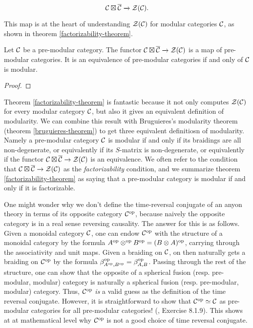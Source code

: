 $${\mathcal C}\boxtimes \overline{{\mathcal C}}\xrightarrow{} {\mathcal Z}({\mathcal C}).$$

This map is at the heart of understanding ${\mathcal Z}({\mathcal C})$ for modular categories ${\mathcal C}$, as shown in theorem \ref{factorizability-theorem}.

\begin{thrm}\label{factorizability-theorem} Let ${\mathcal C}$ be a pre-modular category. The functor ${\mathcal C}\boxtimes \overline{{\mathcal C}}\xrightarrow{}{\mathcal Z}({\mathcal C})$ is a map of pre-modular categories. It is an equivalence of pre-modular categories if and only of ${\mathcal C}$ is modular.
\end{thrm}
\begin{proof}
\end{proof}

\begin{rem} Theorem \ref{factorizability-theorem} is fantastic because it not only computes ${\mathcal Z}({\mathcal C})$ for every modular category ${\mathcal C}$, but also it gives an equivalent definition of modularity. We can combine this result with Bruguieres's modularity theorem (theorem \ref{bruguieres-theorem}) to get three equivalent definitiosn of modularity. Namely a pre-modular category ${\mathcal C}$ is modular if and only if its braidings are all non-degenerate, or equivalently if its $S$-matrix is non-degenerate, or equivalently if the functor ${\mathcal C}\boxtimes \overline{{\mathcal C}}\to {\mathcal Z}({\mathcal C})$ is an equivalence. We often refer to the condition that ${\mathcal C}\boxtimes \overline{{\mathcal C}}\to {\mathcal Z}({\mathcal C})$ as the {\em factorizability} condition, and we summarize theorem \ref{factorizability-theorem} as saying that a pre-modular category is modular if and only if it is factorizable.
\end{rem}

\begin{rem}
One might wonder why we don't define the time-reversal conjugate of an anyon theory in terms of its opposite category ${\mathcal C}^{\operatorname{op}}$, because naively the opposite category is in a real sense reversing causality. The answer for this is as follows. Given a monoidal category ${\mathcal C}$, one can endow ${\mathcal C}^{\operatorname{op}}$ with the structure of a monoidal category by the formula $A^{\operatorname{op}}\otimes^{\operatorname{op}}B^{\operatorname{op}}=(B\otimes A)^{\operatorname{op}}$, carrying through the associativity and unit maps. Given a braiding on ${\mathcal C}$, on then naturally gets a braiding on ${\mathcal C}^{\operatorname{op}}$ by the formula $\beta_{A^{\operatorname{op}},B^{\operatorname{op}}}^{\operatorname{op}}=\beta_{A,B}^{\operatorname{op}}$. Passing through the rest of the structure, one can show that the opposite of a spherical fusion (resp. pre-modular, modular) category is naturally a spherical fusion (resp. pre-modular, modular) category. Thus, ${\mathcal C}^{\operatorname{op}}$ {\em is} a valid guess as the definition of the time reversal conjugate. However, it is straightforward to show that ${\mathcal C}^{\operatorname{op}}\simeq {\mathcal C}$ as pre-modular categories for all pre-modular categories! (\cite{etingof2016tensor}, Exercise 8.1.9). This shows at at mathematical level why ${\mathcal C}^{\operatorname{op}}$ is not a good choice of time reversal conjugate.
\end{rem}



